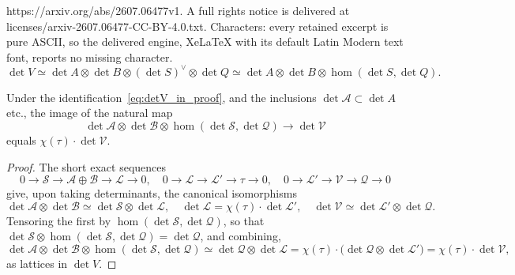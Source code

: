 \documentclass[10pt,a4paper]{amsart}
\newcommand{\ca}{\mathcal{A}}
\newcommand{\cb}{\mathcal{B}}
\newcommand{\cl}{\mathcal{L}}
\newcommand{\cq}{\mathcal{Q}}
\newcommand{\cs}{\mathcal{S}}
\newcommand{\cv}{\mathcal{V}}
\begin{document}
https://arxiv.org/abs/2607.06477v1. A full rights notice is delivered at licenses/arxiv-2607.06477-CC-BY-4.0.txt. Characters: every retained excerpt is pure ASCII, so the delivered engine, XeLaTeX with its default Latin Modern text font, reports no missing character.
\begin{equation}
  \label{eq:detV_in_proof}
  \det V \simeq \det A \otimes \det B \otimes (\det S)^\vee \otimes \det Q \simeq \det A \otimes \det B \otimes \hom(\det S, \det Q).
\end{equation}

\begin{proposition}\label{prop:arithmetic_perturbation}
  Under the identification~\eqref{eq:detV_in_proof}, and the inclusions $\det \ca \subset \det A$ etc., the image of the natural map 
  \[
    \det \ca \otimes \det \cb \otimes \hom(\det \cs, \det \cq) \to \det \cv
  \]
  equals $\chi(\tau) \cdot \det \cv$.
\end{proposition}

\begin{proof}
  The short exact sequences
  \[
    0 \to \cs \to \ca \oplus \cb \to \cl \to 0, \quad
    0 \to \cl \to \cl' \to \tau \to 0, \quad
    0 \to \cl' \to \cv \to \cq \to 0
  \]
  give, upon taking determinants, the canonical isomorphisms
  \[
    \det \ca \otimes \det \cb \simeq \det \cs \otimes \det \cl, \quad
    \det \cl = \chi(\tau) \cdot \det \cl', \quad
    \det \cv \simeq \det \cl' \otimes \det \cq.
  \]
   Tensoring the first by $\hom(\det \cs, \det \cq)$, so that $\det \cs \otimes \hom(\det \cs, \det \cq) = \det \cq$, and combining,
  \[
    \det \ca \otimes \det \cb \otimes \hom(\det \cs, \det \cq) \simeq \det \cq \otimes \det \cl = \chi(\tau) \cdot \bigl(\det \cq \otimes \det \cl'\bigr) = \chi(\tau) \cdot \det \cv,
  \]
  as lattices in $\det V$.
\end{proof}
\end{document}
